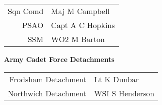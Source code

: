 \begin{center}
  \begin{tabular}{rl}
    Sqn Comd & Maj M Campbell \\
    PSAO & Capt A C Hopkins \\
    SSM & WO2 M Barton \\
  \end{tabular}
\end{center}

\vspace*{10mm}

\begin{center}
  \Large
  \textbf{Army Cadet Force Detachments}
\end{center}

\begin{center}
  \begin{tabular}{rl}
    Frodsham Detachment & Lt K Dunbar \\
    Northwich Detachment & WSI S Henderson \\
  \end{tabular}
\end{center}
